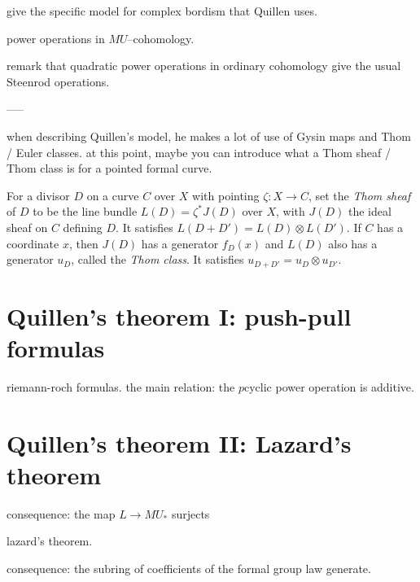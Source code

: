 



give the specific model for complex bordism that Quillen uses.

power operations in $MU$--cohomology.

remark that quadratic power operations in ordinary cohomology give the usual Steenrod operations.


-----

when describing Quillen's model, he makes a lot of use of Gysin maps and Thom / Euler classes. at this point, maybe you can introduce what a Thom sheaf / Thom class is for a pointed formal curve.

\begin{definition}
For a divisor $D$ on a curve $C$ over $X$ with pointing $\zeta: X \to C$, set the \textit{Thom sheaf} of $D$ to be the line bundle $L(D) = \zeta^* J(D)$ over $X$, with $J(D)$ the ideal sheaf on $C$ defining $D$.  It satisfies $L(D + D') = L(D) \otimes L(D')$.  If $C$ has a coordinate $x$, then $J(D)$ has a generator $f_D(x)$ and $L(D)$ also has a generator $u_D$, called the \textit{Thom class}.  It satisfies $u_{D + D'} = u_D \otimes u_{D'}$.
\end{definition}






\section{Quillen's theorem I: push-pull formulas}

riemann-roch formulas.  the main relation: the $p$\th cyclic power operation is additive.



\section{Quillen's theorem II: Lazard's theorem}

consequence: the map $L \to MU_*$ surjects

lazard's theorem.

consequence: the subring of coefficients of the formal group law generate.














